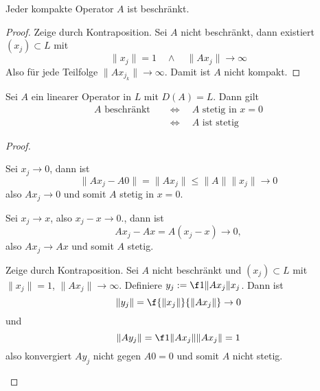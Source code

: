 \documentclass{mycourse}
\begin{document}
\begin{st} \label{1.26}
	Jeder kompakte Operator $A$ ist beschränkt.
	\begin{proof}
		Zeige durch Kontraposition.
		Sei $A$ nicht beschränkt, dann existiert $(x_j) \subset L$ mit 
		\[
			\|x_j\| = 1  \quad\land\quad \|Ax_j\| \to \infty
		\]
		Also für jede Teilfolge $\|Ax_{j_k}\| \to \infty$.
		Damit ist $A$ nicht kompakt.
	\end{proof}
\end{st}

\begin{st} \label{1.27}
	Sei $A$ ein linearer Operator in $L$ mit $D(A) = L$.
	Dann gilt
	\begin{align*}
		A \text{ beschränkt} 
		&\quad\iff\quad A \text{ stetig in } x = 0 \\
		&\quad\iff\quad A \text{ ist stetig}
	\end{align*}
	\begin{proof}
		\begin{seg}[$A$ beschränkt $\implies$ $A$ stetig in $x=0$]
			Sei $x_j \to 0$, dann ist
			\[
				\|Ax_j - A 0 \| = \|Ax_j\| \le \|A\| \|x_j\| \to 0
			\]
			also $Ax_j \to 0$ und somit $A$ stetig in $x=0$.
		\end{seg}
		\begin{seg}[$A$ stetig in $x_0=0$ $\implies$ $A$ stetig]
			Sei $x_j \to x$, also $x_j - x \to 0$., dann ist
			\[
				Ax_j - Ax = A(x_j - x) \to 0,
			\]
			also $Ax_j \to Ax$ und somit $A$ stetig.
		\end{seg}
		\begin{seg}
			Zeige durch Kontraposition.
			Sei $A$ nicht beschränkt und $(x_j) \subset L$ mit $\|x_j\| = 1$, $\|Ax_j\| \to \infty$.
			Definiere $y_j := \f 1{\|Ax_j\|}x_j$.
			Dann ist
			\[
				\|y_j\| = \f {\|x_j\|}{\|Ax_j\|} \to 0
			\]
			und
			\[
				\|Ay_j\| = \f 1{\|Ax_j\|} \|Ax_j\| = 1
			\]
			also konvergiert $Ay_j$ nicht gegen $A0 = 0$ und somit $A$ nicht stetig.
		\end{seg}
	\end{proof}
\end{st}
\end{document}
